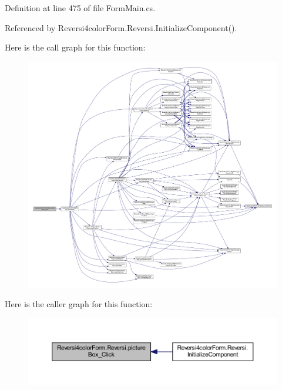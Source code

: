 Definition at line 475 of file Form\+Main.\+cs.



Referenced by Reversi4color\+Form.\+Reversi.\+Initialize\+Component().

Here is the call graph for this function\+:\nopagebreak
\begin{figure}[H]
\begin{center}
\leavevmode
\includegraphics[width=350pt]{class_reversi4color_form_1_1_reversi_af0467d1e6e97eab2d7f6f12384129135_cgraph}
\end{center}
\end{figure}
Here is the caller graph for this function\+:\nopagebreak
\begin{figure}[H]
\begin{center}
\leavevmode
\includegraphics[width=350pt]{class_reversi4color_form_1_1_reversi_af0467d1e6e97eab2d7f6f12384129135_icgraph}
\end{center}
\end{figure}
\mbox{\label{class_reversi4color_form_1_1_reversi_afacffb0f4d383892677acfd1b7304606}} 

